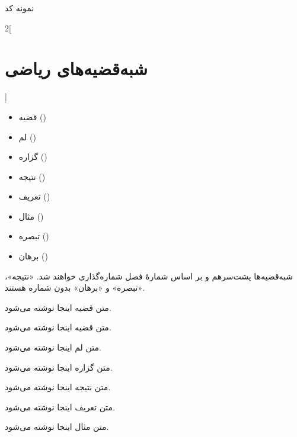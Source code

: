 \begin{code}[!htb]
	
	\caption{نمونه کد
		}
	\label{mat:example}
\end{code}


\begin{multicols}{2}[\section{شبه‌قضیه‌های ریاضی}]
	\begin{itemize}
		\item
		قضیه
		()
		\item
		لم
		()
		\item
		گزاره
		()
		\item
		نتیجه
		()
		\item
		تعریف
		()
		\item
		مثال
		()
		\item
		تبصره
		()
		\item
		برهان
		()
	\end{itemize}
\end{multicols}
شبه‌قضیه‌ها پشت‌سرهم و بر اساس شمارهٔ فصل شماره‌گذاری خواهند شد. «نتیجه»، «تبصره»
و «برهان» بدون شماره هستند.

\begin{thm}
	متن قضیه اینجا نوشته می‌شود.
\end{thm}

\begin{thm}
متن قضیه اینجا نوشته می‌شود.
\end{thm}

\begin{lem}
متن لم اینجا نوشته می‌شود.
\end{lem}

\begin{prop}
متن گزاره اینجا نوشته می‌شود.
\end{prop}

\begin{cor}
متن نتیجه اینجا نوشته می‌شود.
\end{cor}

\begin{defn}
متن تعریف اینجا نوشته می‌شود.
\end{defn}

\begin{exmp}
متن مثال اینجا نوشته می‌شود.
\end{exmp}

